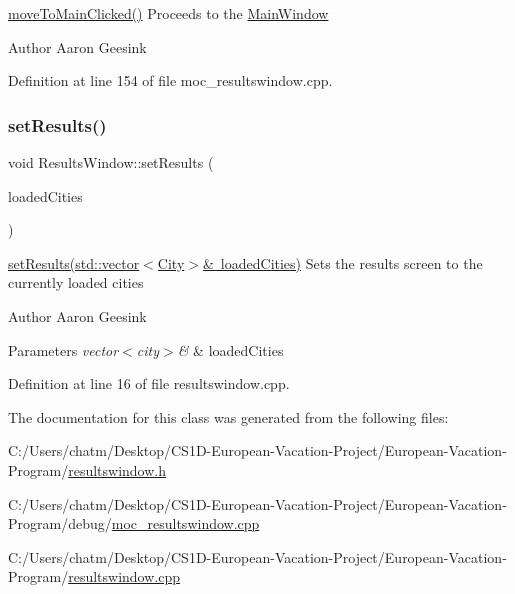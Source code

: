 \mbox{\hyperlink{class_results_window_a55bcbc29f4f178f52fc610a09ec21cb3}{move\+To\+Main\+Clicked()}} Proceeds to the \mbox{\hyperlink{class_main_window}{Main\+Window}} 

\begin{DoxyAuthor}{Author}
Aaron Geesink 
\end{DoxyAuthor}


Definition at line 154 of file moc\+\_\+resultswindow.\+cpp.

\mbox{\label{class_results_window_ada6aa2afee19356d33b6b59646366cc2}} 
\subsubsection{\texorpdfstring{setResults()}{setResults()}}
{\footnotesize\ttfamily void Results\+Window\+::set\+Results (\begin{DoxyParamCaption}\item[{std\+::vector$<$ \mbox{\hyperlink{class_city}{City}} $>$ \&}]{loaded\+Cities }\end{DoxyParamCaption})}



\mbox{\hyperlink{class_results_window_ada6aa2afee19356d33b6b59646366cc2}{set\+Results(std\+::vector$<$\+City$>$\& loaded\+Cities)}} Sets the results screen to the currently loaded cities 

\begin{DoxyAuthor}{Author}
Aaron Geesink 
\end{DoxyAuthor}

\begin{DoxyParams}{Parameters}
{\em vector$<$city$>$\&} & loaded\+Cities \\
\hline
\end{DoxyParams}


Definition at line 16 of file resultswindow.\+cpp.



The documentation for this class was generated from the following files\+:\begin{DoxyCompactItemize}
\item 
C\+:/\+Users/chatm/\+Desktop/\+C\+S1\+D-\/\+European-\/\+Vacation-\/\+Project/\+European-\/\+Vacation-\/\+Program/\mbox{\hyperlink{resultswindow_8h}{resultswindow.\+h}}\item 
C\+:/\+Users/chatm/\+Desktop/\+C\+S1\+D-\/\+European-\/\+Vacation-\/\+Project/\+European-\/\+Vacation-\/\+Program/debug/\mbox{\hyperlink{moc__resultswindow_8cpp}{moc\+\_\+resultswindow.\+cpp}}\item 
C\+:/\+Users/chatm/\+Desktop/\+C\+S1\+D-\/\+European-\/\+Vacation-\/\+Project/\+European-\/\+Vacation-\/\+Program/\mbox{\hyperlink{resultswindow_8cpp}{resultswindow.\+cpp}}\end{DoxyCompactItemize}
